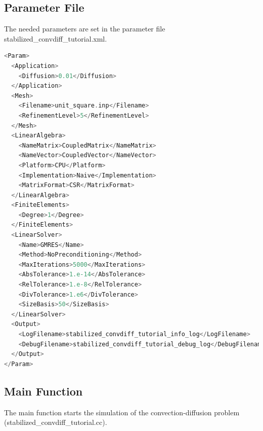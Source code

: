 \documentclass[a4paper, 11pt, twoside]{article}
\begin{document}
\subsection{Parameter File}\label{sectionparameter file}
The needed parameters are set in the parameter file stabilized\_convdiff\_tutorial.xml.
\begin{lstlisting}[language=C++, basicstyle={\footnotesize, \ttfamily}, keywordstyle=\color{blue}, numbers=none, tabsize=4] 
<Param>
  <Application>
    <Diffusion>0.01</Diffusion>
  </Application>
  <Mesh>
    <Filename>unit_square.inp</Filename>
    <RefinementLevel>5</RefinementLevel>
  </Mesh>
  <LinearAlgebra>
    <NameMatrix>CoupledMatrix</NameMatrix>
    <NameVector>CoupledVector</NameVector>
    <Platform>CPU</Platform>
    <Implementation>Naive</Implementation>
    <MatrixFormat>CSR</MatrixFormat>
  </LinearAlgebra>
  <FiniteElements>  
    <Degree>1</Degree>
  </FiniteElements>
  <LinearSolver>
    <Name>GMRES</Name>
    <Method>NoPreconditioning</Method>
    <MaxIterations>5000</MaxIterations>
    <AbsTolerance>1.e-14</AbsTolerance>
    <RelTolerance>1.e-8</RelTolerance>
    <DivTolerance>1.e6</DivTolerance>
    <SizeBasis>50</SizeBasis>
  </LinearSolver>
  <Output>
    <LogFilename>stabilized_convdiff_tutorial_info_log</LogFilename>
    <DebugFilename>stabilized_convdiff_tutorial_debug_log</DebugFilename>
  </Output>
</Param>
\end{lstlisting}

\subsection{Main Function}\label{sectionmain}
The main function starts the simulation of the convection-diffusion problem (stabilized\_convdiff\_tutorial.cc).
\end{document}
